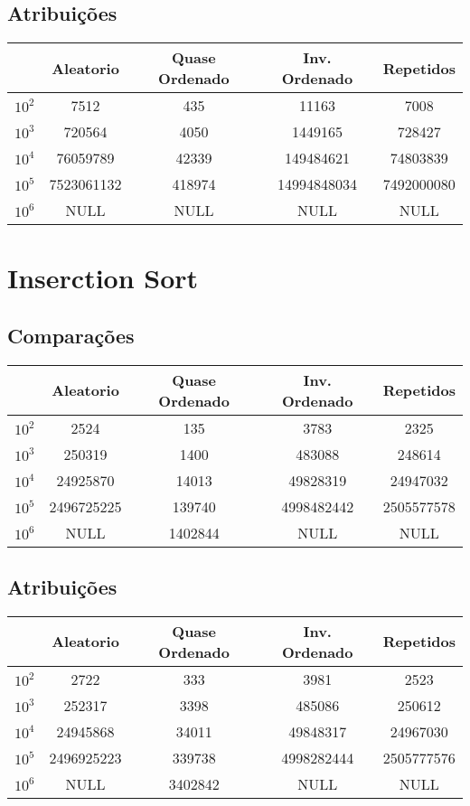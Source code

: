 \subsection{Atribuições}
\begin{tabular}{|c|c|c|c|c|}
\hline
  & Aleatorio  & Quase Ordenado & Inv. Ordenado & Repetidos  \\
  \hline
$10^2$ & 7512       & 435            & 11163         & 7008       \\
\hline
$10^3$ & 720564     & 4050           & 1449165       & 728427     \\
\hline
$10^4$ & 76059789   & 42339          & 149484621     & 74803839   \\
\hline
$10^5$ & 7523061132 & 418974         & 14994848034   & 7492000080 \\
\hline
$10^6$ & NULL       & NULL           & NULL          & NULL      \\
\hline
\end{tabular}

\section{Inserction Sort}
\label{sec:inserction_sort}
\subsection{Comparações}
\begin{tabular}{|c|c|c|c|c|}
\hline
  & Aleatorio  & Quase Ordenado & Inv. Ordenado & Repetidos  \\
  \hline
$10^2$ & 2524       & 135            & 3783          & 2325       \\
\hline
$10^3$ & 250319     & 1400           & 483088        & 248614     \\
\hline
$10^4$ & 24925870   & 14013          & 49828319      & 24947032   \\
\hline
$10^5$ & 2496725225 & 139740         & 4998482442    & 2505577578 \\
\hline
$10^6$ & NULL       & 1402844        & NULL          & NULL      \\
\hline
\end{tabular}
\subsection{Atribuições}
\begin{tabular}{|c|c|c|c|c|}
\hline
  & Aleatorio  & Quase Ordenado & Inv. Ordenado & Repetidos  \\
  \hline
$10^2$ & 2722       & 333            & 3981          & 2523       \\
\hline
$10^3$ & 252317     & 3398           & 485086        & 250612     \\
\hline
$10^4$ & 24945868   & 34011          & 49848317      & 24967030   \\
\hline
$10^5$ & 2496925223 & 339738         & 4998282444    & 2505777576 \\
\hline
$10^6$ & NULL       & 3402842        & NULL          & NULL      \\
\hline
\end{tabular}

